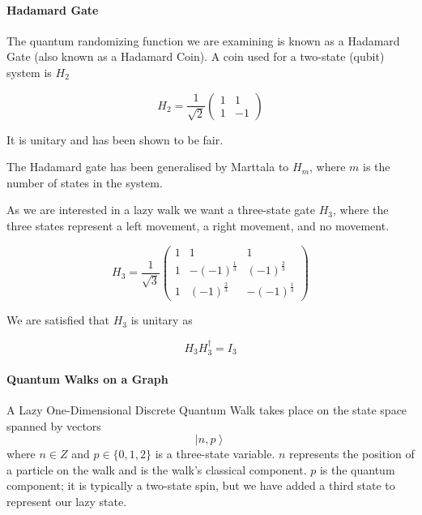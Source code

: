\documentclass[a0,portrait]{a0poster}
\newcommand{\ket}[1]{\left| #1\right\rangle}
\begin{document}
\begin{center}
{\paragraph{Hadamard Gate}

The quantum randomizing function we are examining is known as a Hadamard Gate (also known as a Hadamard Coin). A coin used for a two-state (qubit) system is $H_2$ 

\begin{equation}
H_2 = \dfrac{1}{\sqrt{2}} \begin{pmatrix}
  1 & 1 \\
  1 & -1 
\end{pmatrix}
\label{eq:1}
\end{equation}

It is unitary and has been shown\cite{Ke:2003} to be fair. 

The Hadamard gate has been generalised by Marttala\cite{Ma:2007} to $H_m$, where $m$ is the number of states in the system. 

As we are interested in a lazy walk we want a three-state gate $H_3$, where the three states represent a left movement, a right movement, and no movement.

\begin{equation}
H_3 = \dfrac{1}{\sqrt{3}} \begin{pmatrix}
  1 & 1 & 1 \\
  1 & -(-1)^{\frac{1}{3}} & (-1)^{\frac{2}{3}} \\
  1 & (-1)^{\frac{2}{3}} & -(-1)^{\frac{1}{3}}
\end{pmatrix}
\label{eq:5}
\end{equation}

We are satisfied that $H_3$ is unitary as 

\begin{equation}
H_{3}H_{3}^{\dagger} = I_3
\label{eq:6}
\end{equation}

\paragraph{Quantum Walks on a Graph}

A Lazy One-Dimensional Discrete Quantum Walk takes place on the state space spanned by vectors
\begin{equation}
\ket{n,p}
\label{eq:7}
\end{equation}
where $n\in Z$
and $p\in \{0,1,2\}$ is a three-state variable. $n$ represents the position of a particle on the walk and is the walk's classical component. $p$ is the quantum component; it is typically a two-state spin, but we have added a third state to represent our lazy state. 

}
\end{center}
\end{document}
